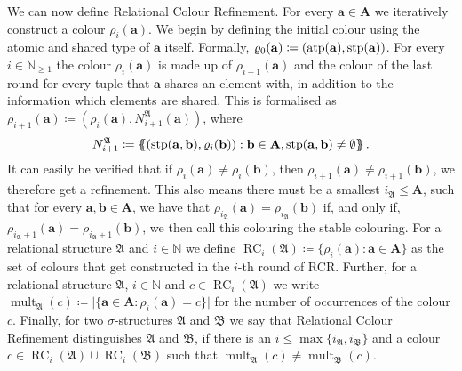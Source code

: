 We can now define Relational Colour Refinement.
For every $\mathbf a\in \mathbf A$ we iteratively construct a colour $\rho_i(\mathbf a)$.
We begin by defining the initial colour using the atomic and shared type of $\mathbf a$ itself.
Formally, $\varrho_0(\mathbf a)\coloneqq(\operatorname{atp}(\mathbf a), \operatorname{stp}(\mathbf a))$.
For every $i \in \mathbb N_{\geq 1}$ the colour $\rho_i(\mathbf a)$ is made up of $\rho_{i-1}(\mathbf a)$ and the colour of the last round for every tuple that $\mathbf a$ shares an element with, in addition to the information which elements are shared.
This is formalised as $\rho_{i+1}(\mathbf a)\coloneqq(\rho_{i}(\mathbf a), N_{i+1}^{\mathfrak A}(\mathbf a))$, where
$$N_{i+1}^{\mathfrak A}\coloneqq \left\{\kern-.35em\left\{(\operatorname{stp}(\mathbf a, \mathbf b), \varrho_{i}(\mathbf b)) : \mathbf b\in \mathbf A, \operatorname{stp}(\mathbf a, \mathbf b)\neq \emptyset\right\}\kern-.35em\right\}.$$
It can easily be verified that if $\rho_i(\mathbf a) \neq \rho_i(\mathbf b)$, then $\rho_{i+1}(\mathbf a)\neq\rho_{i+1}(\mathbf b)$, we therefore get a refinement.
This also means there must be a smallest $i_{\mathfrak A} \leq \mathbf A$, such that for every $\mathbf a, \mathbf b\in \mathbf A$, we have that $\rho_{i_{\mathfrak A}}(\mathbf a) = \rho_{i_{\mathfrak A}}(\mathbf b)$ if, and only if, $\rho_{i_{\mathfrak A}+1}(\mathbf a) = \rho_{i_{\mathfrak A}+1}(\mathbf b)$, we then call this colouring the stable colouring.
For a relational structure $\mathfrak A$ and $i\in \mathbb N$ we define $\operatorname{RC}_i(\mathfrak A)\coloneqq\{\rho_i(\mathbf a) : \mathbf a \in \mathbf A\}$ as the set of colours that get constructed in the $i$-th round of RCR.
Further, for a relational structure $\mathfrak A$, $i\in \mathbb N$ and $c\in \operatorname{RC}_i(\mathfrak A)$ we write $\operatorname{mult}_{\mathfrak A}(c)\coloneqq \vert \{\mathbf a\in \mathbf A : \rho_i(\mathbf a)=c\}\vert$ for the number of occurrences of the colour $c$.
Finally, for two $\sigma$-structures $\mathfrak A$ and $\mathfrak B$ we say that Relational Colour Refinement distinguishes $\mathfrak A$ and $\mathfrak B$, if there is an $i \leq \max\{i_{\mathfrak A}, i_{\mathfrak B}\}$ and a colour $c\in \operatorname{RC}_i(\mathfrak A) \cup \operatorname{RC}_i(\mathfrak B)$ such that $\operatorname{mult}_{\mathfrak A}(c)\neq \operatorname{mult}_{\mathfrak B}(c)$.

